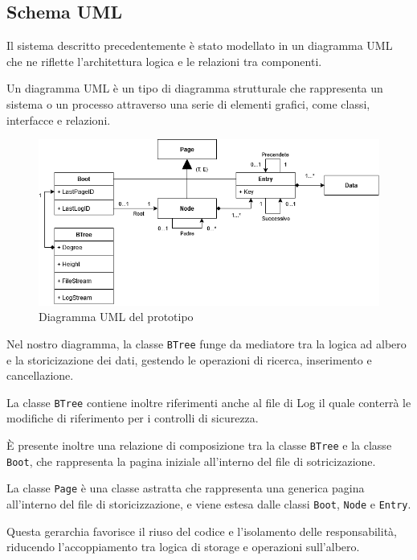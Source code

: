 \documentclass[12pt,a4paper,openright,twoside]{book}
\begin{document}
        \subsection{Schema UML}

            Il sistema descritto precedentemente è stato modellato in un diagramma UML che ne riflette l’architettura logica e le relazioni tra componenti.

            Un diagramma UML è un tipo di diagramma strutturale che rappresenta un sistema o un processo attraverso una serie di elementi grafici, come classi, interfacce e relazioni.

            \begin{figure} [h]
                \centering
                \includegraphics[width=1\linewidth]{figures/UML.png}
                \caption{Diagramma UML del prototipo}
                \label{fig:uml}
            \end{figure}

            Nel nostro diagramma, la classe \texttt{BTree} funge da mediatore tra la logica ad albero e la storicizazione dei dati, gestendo le operazioni di ricerca, inserimento e cancellazione.

            La classe \texttt{BTree} contiene inoltre riferimenti anche al file di Log il quale conterrà le modifiche di riferimento per i controlli di sicurezza.

            È presente inoltre una relazione di composizione tra la classe \texttt{BTree} e la classe \texttt{Boot}, che rappresenta la pagina iniziale all'interno del file di sotricizazione.

            La classe \texttt{Page} è una classe astratta che rappresenta una generica pagina all'interno del file di storicizzazione, e viene estesa dalle classi \texttt{Boot}, \texttt{Node} e \texttt{Entry}.

            Questa gerarchia favorisce il riuso del codice e l’isolamento delle responsabilità, riducendo l’accoppiamento tra logica di storage e operazioni sull’albero.
\end{document}

